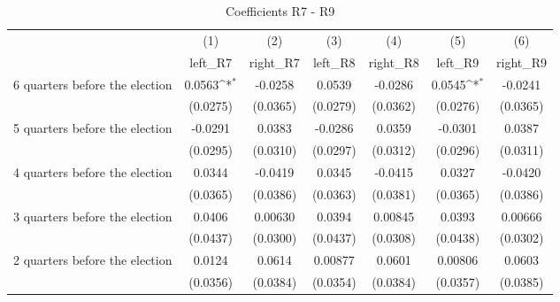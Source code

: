 \begin{table}[htbp]\centering
\def\sym#1{\ifmmode^{#1}\else\(^{#1}\)\fi}
\caption{Coefficients R7 - R9}
\begin{tabular}{l*{6}{c}}
\hline\hline
                    &\multicolumn{1}{c}{(1)}&\multicolumn{1}{c}{(2)}&\multicolumn{1}{c}{(3)}&\multicolumn{1}{c}{(4)}&\multicolumn{1}{c}{(5)}&\multicolumn{1}{c}{(6)}\\
                    &\multicolumn{1}{c}{left\_R7}&\multicolumn{1}{c}{right\_R7}&\multicolumn{1}{c}{left\_R8}&\multicolumn{1}{c}{right\_R8}&\multicolumn{1}{c}{left\_R9}&\multicolumn{1}{c}{right\_R9}\\
\hline
 6 quarters before the election&      0.0563\sym{*}  &     -0.0258         &      0.0539         &     -0.0286         &      0.0545\sym{*}  &     -0.0241         \\
                    &    (0.0275)         &    (0.0365)         &    (0.0279)         &    (0.0362)         &    (0.0276)         &    (0.0365)         \\
[1em]
 5 quarters before the election&     -0.0291         &      0.0383         &     -0.0286         &      0.0359         &     -0.0301         &      0.0387         \\
                    &    (0.0295)         &    (0.0310)         &    (0.0297)         &    (0.0312)         &    (0.0296)         &    (0.0311)         \\
[1em]
 4 quarters before the election&      0.0344         &     -0.0419         &      0.0345         &     -0.0415         &      0.0327         &     -0.0420         \\
                    &    (0.0365)         &    (0.0386)         &    (0.0363)         &    (0.0381)         &    (0.0365)         &    (0.0386)         \\
[1em]
 3 quarters before the election&      0.0406         &     0.00630         &      0.0394         &     0.00845         &      0.0393         &     0.00666         \\
                    &    (0.0437)         &    (0.0300)         &    (0.0437)         &    (0.0308)         &    (0.0438)         &    (0.0302)         \\
[1em]
 2 quarters before the election&      0.0124         &      0.0614         &     0.00877         &      0.0601         &     0.00806         &      0.0603         \\
                    &    (0.0356)         &    (0.0384)         &    (0.0354)         &    (0.0384)         &    (0.0357)         &    (0.0385)         \\

\end{tabular}
\end{table}
